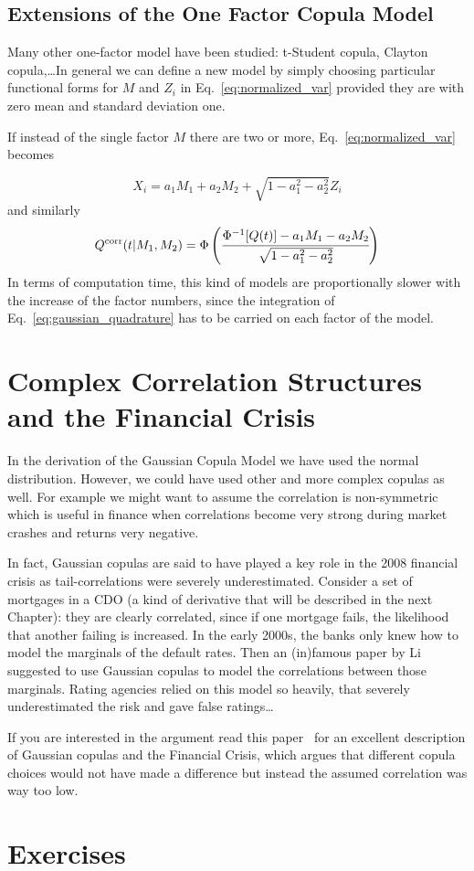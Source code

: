 \subsection{Extensions of the One Factor Copula Model}
Many other one-factor model have been studied: t-Student copula, Clayton copula,\ldots In general we can define a new model by simply choosing particular functional forms for $M$ and $Z_i$ in Eq.~\ref{eq:normalized_var} provided they are with zero mean and standard deviation one. 

If instead of the single factor $M$ there are two or more, Eq.~\ref{eq:normalized_var} becomes

\begin{equation}
X_i = a_1 M_1 + a_2 M_2 + \sqrt{1 - a_1^2 - a^2_2}Z_i
\end{equation}
and similarly
\begin{equation}
Q^{\textrm{corr}}(t|M_1, M_2) = \Phi\left(\cfrac{\Phi^{-1}[Q(t)]-a_1 M_1 - a_2 M_2}{\sqrt{1 - a_1^2 - a^2_2}}\right)
\end{equation}
In terms of computation time, this kind of models are proportionally slower with the increase of the factor numbers, since the integration of Eq.~\ref{eq:gaussian_quadrature} has to be carried on each factor of the model.

\section{Complex Correlation Structures and the Financial Crisis}
\label{complex-correlation-structures-and-the-financial-crisis}

In the derivation of the Gaussian Copula Model we have used the normal distribution. However, we could have used other and more complex copulas as well. For example we might want to assume the correlation is non-symmetric which is useful in finance when correlations become very strong during market crashes and returns very negative.

In fact, Gaussian copulas are said to have played a key role in the 2008 financial crisis as tail-correlations were severely underestimated. Consider a set of mortgages in a CDO (a kind of derivative that will be described in the next Chapter): they are clearly correlated, since if one mortgage fails, the likelihood that another failing is increased. In the early 2000s, the banks only knew how to model the marginals of the default rates. Then an (in)famous paper by Li~\cite{bib:copula_li} suggested to use Gaussian copulas to model the correlations between those marginals. Rating agencies relied on this model so heavily, that severely underestimated the risk and gave false ratings\ldots

If you are interested in the argument read this paper~\cite{bib:copula_and_2008} for an excellent description of Gaussian copulas and the Financial Crisis, which argues that different copula choices would not have made a difference but instead the assumed correlation was way too low.

\section*{Exercises}

